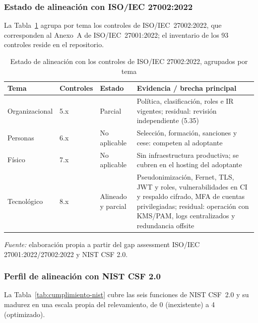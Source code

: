 \subsubsection{Estado de alineación con ISO/IEC 27002:2022}\label{subsec:cumplimiento-iso}

La Tabla~\ref{tab:cumplimiento-iso} agrupa por tema los controles de ISO/IEC~27002:2022, que corresponden al Anexo~A de ISO/IEC~27001:2022; el inventario de los 93 controles reside en el repositorio.

\begin{table}[htbp]
\centering
\caption{Estado de alineación con los controles de ISO/IEC 27002:2022, agrupados por tema}
\label{tab:cumplimiento-iso}
\footnotesize\singlespacing
\setlength{\tabcolsep}{4pt}
\begin{tabular}{@{}>{\raggedright\arraybackslash}p{2.2cm} >{\raggedright\arraybackslash}p{1.4cm} >{\raggedright\arraybackslash}p{1.7cm} >{\raggedright\arraybackslash}p{9.7cm}@{}}
\toprule
\textbf{Tema} & \textbf{Controles} & \textbf{Estado} & \textbf{Evidencia / brecha principal} \\
\midrule
Organizacional & 5.x & Parcial & Política, clasificación, roles e IR vigentes; residual: revisión independiente (5.35) \\
Personas & 6.x & No aplicable & Selección, formación, sanciones y cese: competen al adoptante \\
Físico & 7.x & No aplicable & Sin infraestructura productiva; se cubren en el hosting del adoptante \\
Tecnológico & 8.x & Alineado y parcial & Pseudonimización, Fernet, TLS, JWT y roles, vulnerabilidades en CI y respaldo cifrado, MFA de cuentas privilegiadas; residual: operación con KMS/PAM, logs centralizados y redundancia offsite \\
\bottomrule
\end{tabular}
\par
{\footnotesize\textit{Fuente:} elaboración propia a partir del gap assessment ISO/IEC 27001:2022/27002:2022 y NIST CSF 2.0.\par}
\end{table}

\subsubsection{Perfil de alineación con NIST CSF 2.0}\label{subsec:cumplimiento-nist}

La Tabla~\ref{tab:cumplimiento-nist} cubre las seis funciones de NIST CSF~2.0 y su madurez en una escala propia del relevamiento, de 0 (inexistente) a 4 (optimizado).

